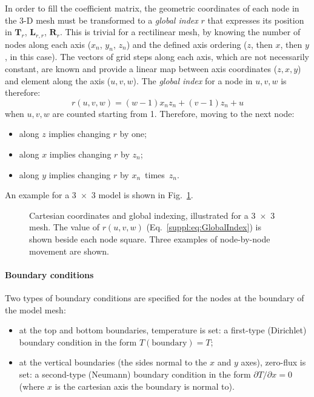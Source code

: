 In order to fill the coefficient matrix, the geometric coordinates of each node in the 3-D mesh must be transformed to a \textit{global index} $r$ that expresses its position in $\bm{T}_r$, $\bm{L}_{r,r}$, $\bm{R}_r$.
This is trivial for a rectilinear mesh, by knowing the number of nodes along each axis ($x_n$, $y_n$, $z_n$) and the defined axis ordering ($z$, then $x$, then $y$, in this case).
The vectors of grid steps along each axis, which are not necessarily constant, are known and provide a linear map between axis coordinates ($z,x,y$) and element along the axis ($u,v,w$).
The \textit{global index} for a node in $u,v,w$ is therefore:
\begin{equation}
    \label{suppl:eq:GlobalIndex}
    r(u,v,w) = (w-1) x_n z_n + (v-1) z_n + u
\end{equation}
when $u,v,w$ are counted starting from \num{1}.
Therefore, moving to the next node:
\begin{itemize}
    \item along $z$ implies changing $r$ by one;
    \item along $x$ implies changing $r$ by $z_n$;
    \item along $y$ implies changing $r$ by $x_n$~times~$z_n$.
\end{itemize}
An example for a 3~$\times$~3 model is shown in Fig.~\ref{suppl:fig:GridIndexing}.

\begin{figure}[h]
    \begin{adjustbox}{center}
    \end{adjustbox}
    \caption[Cartesian coordinates and global indexing on a 3~$\times$~3 mesh.]{Cartesian coordinates and global indexing, illustrated for a 3~$\times$~3 mesh. The value of $r(u,v,w)$ (Eq.~\ref{suppl:eq:GlobalIndex}) is shown beside each node square. Three examples of node-by-node movement are shown.}
    \label{suppl:fig:GridIndexing}
\end{figure}

\FloatBarrier

\paragraph*{Boundary conditions}
Two types of boundary conditions are specified for the nodes at the boundary of the model mesh:
\begin{itemize}
    \item at the top and bottom boundaries, temperature is set: a first-type (Dirichlet) boundary condition in the form $T(\mathrm{boundary}) = T$;
    \item at the vertical boundaries (the sides normal to the $x$ and $y$ axes), zero-flux is set: a second-type (Neumann) boundary condition in the form $\partial T / \partial x = 0$ (where $x$ is the cartesian axis the boundary is normal to).
\end{itemize}

